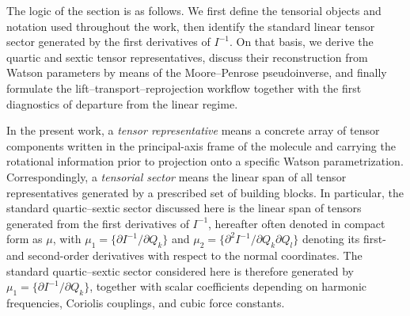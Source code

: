\documentclass[aip,jcp,reprint,floatfix]{revtex4-2}
\begin{document}
The logic of the section is as follows. We first define the tensorial
objects and notation used throughout the work, then identify the
standard linear tensor sector generated by the first derivatives of
$I^{-1}$. On that basis, we derive the quartic and sextic tensor
representatives, discuss their reconstruction from Watson parameters by
means of the Moore--Penrose pseudoinverse, and finally formulate the
lift--transport--reprojection workflow together with the first
diagnostics of departure from the linear regime.

In the present work, a \emph{tensor representative} means a concrete
array of tensor components written in the principal-axis frame of the
molecule and carrying the rotational information prior to projection
onto a specific Watson parametrization. Correspondingly, a
\emph{tensorial sector} means the linear span of all tensor
representatives generated by a prescribed set of building blocks. In
particular, the standard quartic--sextic sector discussed here is the
linear span of tensors generated from the first derivatives of
$I^{-1}$, hereafter often denoted in compact form as $\mu$, with
$\mu_1=\{\partial I^{-1}/\partial Q_k\}$ and
$\mu_2=\{\partial^2 I^{-1}/\partial Q_k\partial Q_l\}$ denoting its
first- and second-order derivatives with respect to the normal
coordinates. The standard quartic--sextic sector considered here is
therefore generated by $\mu_1=\{\partial I^{-1}/\partial Q_k\}$,
together with scalar coefficients depending on harmonic frequencies,
Coriolis couplings, and cubic force constants.
\end{document}
